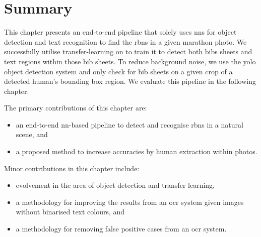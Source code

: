\section{Summary}

This chapter presents an end-to-end pipeline that solely uses \glspl{nn} for object detection and text recognition to find the \glspl{rbn} in a given marathon photo. We successfully utilise transfer-learning on \frcnn{} to train it to detect both bibs sheets and text regions within those bib sheets. To reduce background noise, we use the \gls{yolo} object detection system and only check for bib sheets on a given crop of a detected human's bounding box region. We evaluate this pipeline in the following chapter.

\bigskip

\noindent
The primary contributions of this chapter are:

\begin{itemize}
  \item an end-to-end \gls{nn}-based pipeline to detect and recognise \glspl{rbn} in a natural scene, and
  \item a proposed method to increase accuracies by human extraction within photos.
\end{itemize}

\noindent
Minor contributions in this chapter include:

\begin{itemize}
  \item evolvement in the area of object detection and transfer learning,
  \item a methodology for improving the results from an \gls{ocr} system given images without binarised text colours, and
  \item a methodology for removing false positive cases from an \gls{ocr} system.
\end{itemize}